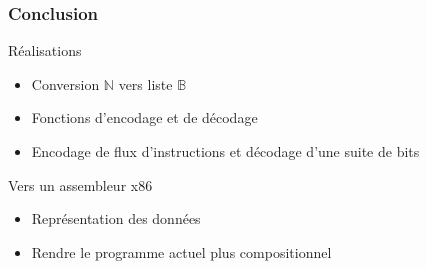 \documentclass{beamer}
\begin{document}
\begin{frame}
  \frametitle{Conclusion}
  
  \begin{block}{Réalisations}
    \begin{itemize}
    \item Conversion \ensuremath{\mathbb{N}} vers liste \ensuremath{\mathbb{B}}
    \item Fonctions d'encodage et de décodage
    \item Encodage de flux d'instructions et décodage d'une suite de bits
    \end{itemize}
  \end{block}  
  
  \begin{block}{Vers un assembleur x86}
    \begin{itemize}
    \item Représentation des données
    \item Rendre le programme actuel plus compositionnel
    \end{itemize}
  \end{block}
  
\end{frame}
\end{document}
